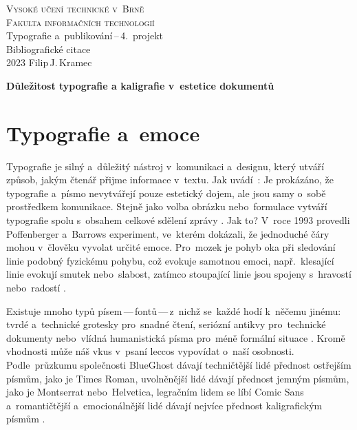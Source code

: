 \documentclass[a4paper, 11pt]{article}
\begin{document}
\begin{titlepage}
	\begin{center}
		{\Huge \textsc{Vysoké učení technické v~Brně}\\}
		{\huge \textsc{Fakulta informačních technologií}\\}
		{\LARGE Typografie a~publikování\,--\,4.\ projekt\\}
		{\Huge Bibliografické citace\\}
		{\Large 2023 \hfill Filip\,J.\,Kramec}
	\end{center}
\end{titlepage}

\begin{center}
	\Large
	\textbf{Důležitost typografie a kaligrafie v~estetice dokumentů}
	\bigskip
\end{center}
\section*{Typografie a~emoce}

Typografie je silný a~důležitý nástroj v~komunikaci a~designu, který utváří
způsob, jakým čtenář přijme informace v~textu.
Jak uvádí~\textcite{Koch:2012:EmotionIT}: 
Je prokázáno, že typografie a~písmo nevytvářejí pouze estetický dojem,
ale jsou samy o~sobě prostředkem komunikace. Stejně jako volba obrázku
nebo~formulace vytváří typografie spolu s~obsahem
celkové sdělení zprávy \parencite{Pilka:2019:CharakterPisma}. 
Jak to? V~roce 1993 provedli Poffenberger a~Barrows experiment,
ve~kterém dokázali, že jednoduché čáry mohou v~člověku vyvolat určité emoce.
Pro~mozek je pohyb oka při sledování linie podobný fyzickému pohybu,
což evokuje samotnou emoci, např.~klesající linie evokují smutek nebo~slabost,
zatímco stoupající linie jsou spojeny s~hravostí nebo~radostí
\parencite{Sladovnikova:2021:EmoceTextu}.

Existuje mnoho typů písem\,---\,fontů\,---\,z~nichž se~každé hodí k~něčemu
jinému: tvrdé a~technické grotesky pro~snadné čtení, seriózní antikvy
pro~technické dokumenty nebo~vlídná humanistická písma pro~méně formální situace
\parencite{Samara:2010:ZakladyDesignu}.
Kromě vhodnosti může náš vkus v~psaní leccos vypovídat o~naší osobnosti.
Podle~průzkumu společnosti BlueGhost dávají techničtější lidé přednost ostřejším
písmům, jako je Times Roman, uvolněnější lidé dávají přednost jemným písmům,
jako je Montserrat nebo~Helvetica, legračním lidem se líbí Comic Sans
a~romantičtější a~emocionálnější lidé dávají nejvíce přednost kaligrafickým
písmům \parencite{Pilka:2019:CharakterPisma}.
\end{document}
